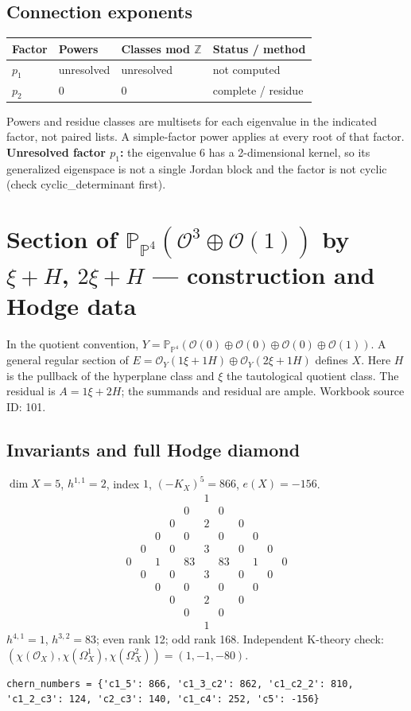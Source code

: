 \documentclass[10pt,a4paper]{article}
\begin{document}
\subsection*{Connection exponents}
\begin{center}\begin{tabular}{llll}\toprule Factor & Powers & Classes mod $\mathbb Z$ & Status / method\\\midrule
$p_{1}$ & unresolved & unresolved & not computed\\
$p_{2}$ & $0$ & $0$ & complete / residue\\
\bottomrule\end{tabular}\end{center}
Powers and residue classes are multisets for each eigenvalue in the indicated factor, not paired lists. A simple-factor power applies at every root of that factor.
\textbf{Unresolved factor $p_{1}$:} the eigenvalue 6 has a 2-dimensional kernel, so its generalized eigenspace is not a single Jordan block and the factor is not cyclic (check cyclic\_determinant first).
\clearpage\section*{Section of $\mathbb P_{\mathbb P^{4}}(\mathcal O^{3}\oplus \mathcal O(1))$ by $\xi +H$, $2\xi +H$ --- construction and Hodge data}\label{entry:PB5-101}
In the quotient convention, $Y=\mathbb P_{\mathbb P^{4}}(\mathcal O(0)\oplus\mathcal O(0)\oplus\mathcal O(0)\oplus\mathcal O(1))$.
A general regular section of $E=\mathcal O_Y(1\xi+1H)\oplus\mathcal O_Y(2\xi+1H)$ defines $X$.
Here $H$ is the pullback of the hyperplane class and $\xi$ the tautological quotient class. The residual is $A=1\xi+2H$; the summands and residual are ample.
Workbook source ID: 101.
\subsection*{Invariants and full Hodge diamond}
$\dim X=5$, $h^{1,1}=2$, index $1$, $(-K_X)^5=866$, $e(X)=-156$.
\[\begin{array}{ccccccccccc}&&&&&1&&&&&\\&&&&0&&0&&&&\\&&&0&&2&&0&&&\\&&0&&0&&0&&0&&\\&0&&0&&3&&0&&0&\\0&&1&&83&&83&&1&&0\\&0&&0&&3&&0&&0&\\&&0&&0&&0&&0&&\\&&&0&&2&&0&&&\\&&&&0&&0&&&&\\&&&&&1&&&&&\end{array}\]
$h^{4,1}=1$, $h^{3,2}=83$; even rank 12; odd rank 168.
Independent K-theory check: $(\chi(\mathcal O_X),\chi(\Omega_X^1),\chi(\Omega_X^2))=(1, -1, -80)$.
\begin{lstlisting}
chern_numbers = {'c1_5': 866, 'c1_3_c2': 862, 'c1_c2_2': 810, 'c1_2_c3': 124, 'c2_c3': 140, 'c1_c4': 252, 'c5': -156}
\end{lstlisting}
\end{document}
